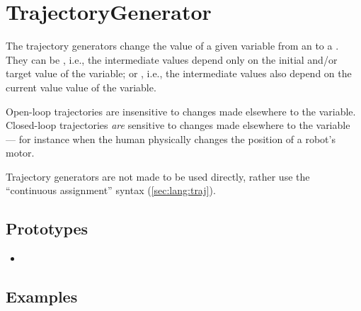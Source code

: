 
\section{TrajectoryGenerator}

The trajectory generators change the value of a given variable from an
 to a .  They can be
, i.e., the intermediate values depend only on the
initial and/or target value of the variable; or ,
i.e., the intermediate values also depend on the current value value
of the variable.

Open-loop trajectories are insensitive to changes made elsewhere to
the variable.  Closed-loop trajectories \emph{are} sensitive to
changes made elsewhere to the variable --- for instance when the human
physically changes the position of a robot's motor.

Trajectory generators are not made to be used directly, rather use the
``continuous assignment'' syntax (\autoref{sec:lang:traj}).


\subsection{Prototypes}
\begin{itemize}
\item {}
\end{itemize}

\subsection{Examples}
\label{sec:traj:examples}

\let\subsubsectionOrig\subsubsection
\renewcommand{\subsubsection}[1]
{%
  \subsubsectionOrig{\label{sec:traj:#1}#1}%
  \index{#1@\lstinline{#1}}%
}

